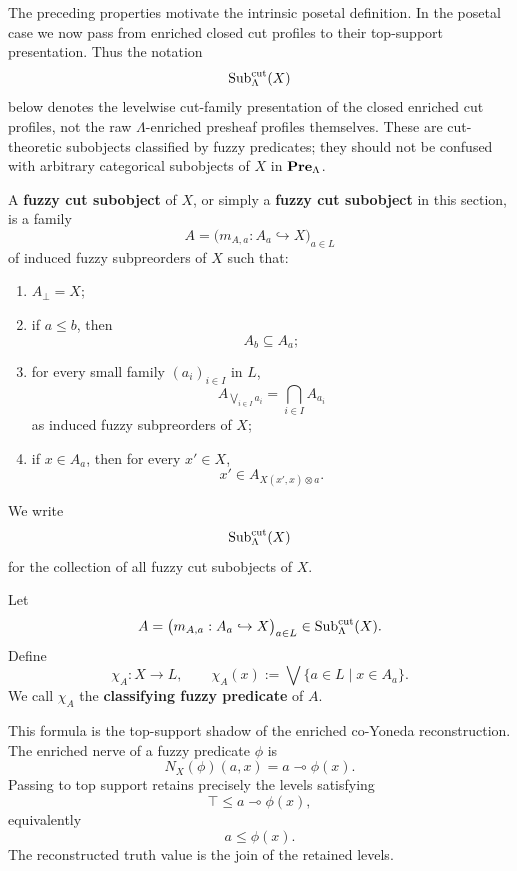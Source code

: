 The preceding properties motivate the intrinsic posetal definition. In the posetal case we now pass from enriched closed cut profiles to their top-support presentation. Thus the notation
\[
    \mathrm{Sub}^{\mathrm{cut}}_\Lambda(X)
\]
below denotes the levelwise cut-family presentation of the closed enriched cut profiles, not the raw \(\Lambda\)-enriched presheaf profiles themselves. These are cut-theoretic subobjects classified by fuzzy predicates; they should not be confused with arbitrary categorical subobjects of \(X\) in \(\mathbf{Pre}_\Lambda\).

\begin{definition}
\label{def:fuzzy-subobject}
    A \textbf{fuzzy cut subobject} of \(X\), or simply a \textbf{fuzzy cut subobject} in this section, is a family
    \[
        A=\bigl(m_{A,a}:A_a\hookrightarrow X\bigr)_{a\in L}
    \]
    of induced fuzzy subpreorders of \(X\) such that:
    \begin{enumerate}[label=\textup{(F\arabic*)}]
        \item \(A_\bot=X\);

        \item if \(a\leq b\), then
        \[
            A_b\subseteq A_a;
        \]

        \item for every small family \((a_i)_{i\in I}\) in \(L\),
        \[
            A_{\bigvee_{i\in I}a_i}
            =
            \bigcap_{i\in I}A_{a_i}
        \]
        as induced fuzzy subpreorders of \(X\);

        \item if \(x\in A_a\), then for every \(x'\in X\),
        \[
            x'\in A_{X(x',x)\otimes a}.
        \]
    \end{enumerate}
    We write
    \[
        \mathrm{Sub}^{\mathrm{cut}}_\Lambda(X)
    \]
    for the collection of all fuzzy cut subobjects of \(X\).
\end{definition}

\begin{definition}
\label{def:classifying-predicate}
    Let
    \[
        A=\bigl(m_{A,a}:A_a\hookrightarrow X\bigr)_{a\in L}
        \in\mathrm{Sub}^{\mathrm{cut}}_\Lambda(X).
    \]
    Define
    \[
        \chi_A:X\to L,
        \qquad
        \chi_A(x):=\bigvee\{a\in L\mid x\in A_a\}.
    \]
    We call \(\chi_A\) the \textbf{classifying fuzzy predicate} of \(A\).
\end{definition}

This formula is the top-support shadow of the enriched co-Yoneda reconstruction. The enriched nerve of a fuzzy predicate \(\phi\) is
\[
    N_X(\phi)(a,x)=a\multimap\phi(x).
\]
Passing to top support retains precisely the levels satisfying
\[
    \top\leq a\multimap\phi(x),
\]
equivalently
\[
    a\leq\phi(x).
\]
The reconstructed truth value is the join of the retained levels.

